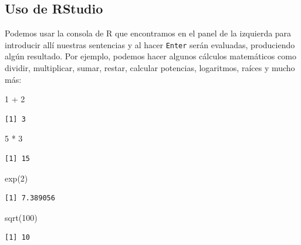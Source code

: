 \documentclass[
]{book}
\newenvironment{Shaded}{\begin{snugshade}}{\end{snugshade}}
\newcommand{\DecValTok}[1]{\textcolor[rgb]{0.00,0.00,0.81}{#1}}
\newcommand{\FunctionTok}[1]{\textcolor[rgb]{0.00,0.00,0.00}{#1}}
\newcommand{\NormalTok}[1]{#1}
\newcommand{\SpecialCharTok}[1]{\textcolor[rgb]{0.00,0.00,0.00}{#1}}
\begin{document}
\hypertarget{uso-de-rstudio}{%
\subsection{Uso de RStudio}\label{uso-de-rstudio}}

Podemos usar la consola de R que encontramos en el panel de la izquierda para introducir allí nuestras sentencias y al hacer \texttt{Enter} serán evaluadas, produciendo algún resultado. Por ejemplo, podemos hacer algunos cálculos matemáticos como dividir, multiplicar, sumar, restar, calcular potencias, logaritmos, raíces y mucho más:

\begin{Shaded}
\begin{Highlighting}[]
\DecValTok{1} \SpecialCharTok{+} \DecValTok{2}
\end{Highlighting}
\end{Shaded}

\begin{verbatim}
[1] 3
\end{verbatim}

\begin{Shaded}
\begin{Highlighting}[]
\DecValTok{5} \SpecialCharTok{*} \DecValTok{3}
\end{Highlighting}
\end{Shaded}

\begin{verbatim}
[1] 15
\end{verbatim}

\begin{Shaded}
\begin{Highlighting}[]
\FunctionTok{exp}\NormalTok{(}\DecValTok{2}\NormalTok{)}
\end{Highlighting}
\end{Shaded}

\begin{verbatim}
[1] 7.389056
\end{verbatim}

\begin{Shaded}
\begin{Highlighting}[]
\FunctionTok{sqrt}\NormalTok{(}\DecValTok{100}\NormalTok{)}
\end{Highlighting}
\end{Shaded}

\begin{verbatim}
[1] 10
\end{verbatim}
\end{document}

